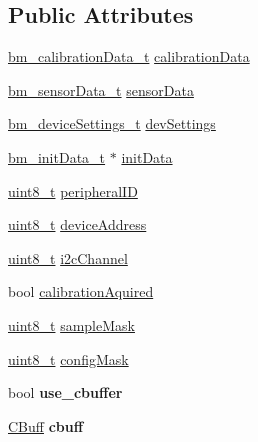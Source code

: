 \subsection*{Public Attributes}
\begin{DoxyCompactItemize}
\item 
\hyperlink{structBM__CalibrationData}{bm\+\_\+calibration\+Data\+\_\+t} \hyperlink{structbm__controlData_ac4a27ff2241323607245cbcb92f116f1}{calibration\+Data}
\item 
\hyperlink{structBM__sensorData}{bm\+\_\+sensor\+Data\+\_\+t} \hyperlink{structbm__controlData_a193dc45579d41ddf5273944cc8e0280c}{sensor\+Data}
\item 
\hyperlink{structbm__deviceSettings}{bm\+\_\+device\+Settings\+\_\+t} \hyperlink{structbm__controlData_af23dc8bec3148792f6fa2b437b6c4b7e}{dev\+Settings}
\item 
\hyperlink{structbm__initData}{bm\+\_\+init\+Data\+\_\+t} $\ast$ \hyperlink{structbm__controlData_a80c9c43ce6ae374806c612da04e03fd0}{init\+Data}
\item 
\hyperlink{vl53l0x__types_8h_aba7bc1797add20fe3efdf37ced1182c5}{uint8\+\_\+t} \hyperlink{structbm__controlData_a7364074fe9f7b59f28e97613070cc633}{peripheral\+ID}
\item 
\hyperlink{vl53l0x__types_8h_aba7bc1797add20fe3efdf37ced1182c5}{uint8\+\_\+t} \hyperlink{structbm__controlData_a22557e44c56d8291489a7e2d419bac88}{device\+Address}
\item 
\hyperlink{vl53l0x__types_8h_aba7bc1797add20fe3efdf37ced1182c5}{uint8\+\_\+t} \hyperlink{structbm__controlData_af40ad56e060f5584e4d4d31e3c3c48d8}{i2c\+Channel}
\item 
bool \hyperlink{structbm__controlData_a7309b6bd58f8c9fb1f5770f9eb1df3ee}{calibration\+Aquired}
\item 
\hyperlink{vl53l0x__types_8h_aba7bc1797add20fe3efdf37ced1182c5}{uint8\+\_\+t} \hyperlink{structbm__controlData_a895f3f4166087e92d8217c116f397bcf}{sample\+Mask}
\item 
\hyperlink{vl53l0x__types_8h_aba7bc1797add20fe3efdf37ced1182c5}{uint8\+\_\+t} \hyperlink{structbm__controlData_ae1f1f25c8af3e53abb7b98b6f109075e}{config\+Mask}
\item 
\mbox{\label{structbm__controlData_aae381dd947ceca89878f4fa94896cc00}} 
bool {\bfseries use\+\_\+cbuffer}
\item 
\mbox{\label{structbm__controlData_ab84eff19f4d1f3a54aa37d9533bbc70c}} 
\hyperlink{structCBuffer__Handle}{C\+Buff} {\bfseries cbuff}
\end{DoxyCompactItemize}


